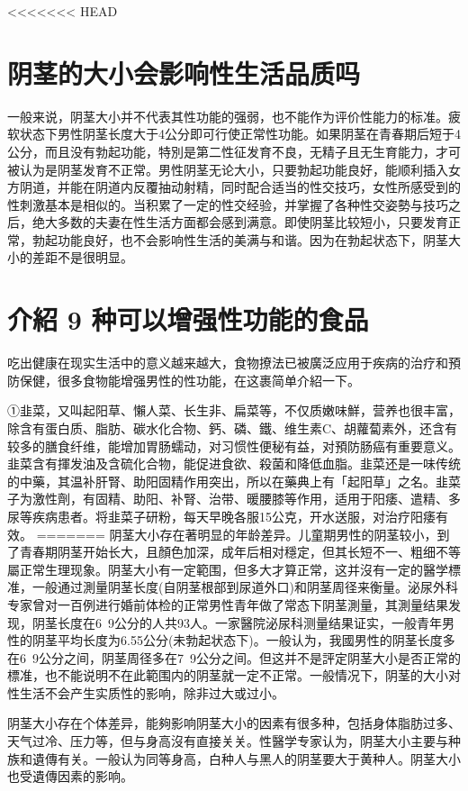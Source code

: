 \documentclass[12pt,UTF8]{ctexbook}
\begin{document}
<<<<<<< HEAD

\section{阴茎的大小会影响性生活品质吗}

一般来说，阴茎大小并不代表其性功能的强弱，也不能作为评价性能力的标准。疲软状态下男性阴茎长度大于4公分即可行使正常性功能。如果阴茎在青春期后短于4公分，而且没有勃起功能，特別是第二性征发育不良，无精子且无生育能力，才可被认为是阴茎发育不正常。男性阴茎无论大小，只要勃起功能良好，能顺利插入女方阴道，并能在阴道内反覆抽动射精，同时配合适当的性交技巧，女性所感受到的性刺激基本是相似的。当积累了一定的性交经验，并掌握了各种性交姿勢与技巧之后，绝大多数的夫妻在性生活方面都会感到满意。即使阴茎比较短小，只要发育正常，勃起功能良好，也不会影响性生活的美满与和谐。因为在勃起状态下，阴茎大小的差距不是很明显。

\section{介紹 9 种可以增强性功能的食品}

吃出健康在现实生活中的意义越来越大，食物撩法已被廣泛应用于疾病的治疗和預防保健，很多食物能增强男性的性功能，在这裹简单介紹一下。

①韭菜，又叫起阳草、懶人菜、长生非、扁菜等，不仅质嫩味鮮，营养也很丰富，除含有蛋白质、脂肪、碳水化合物、鈣、磷、鐵、维生素C、胡蘿蔔素外，还含有较多的膳食纤维，能增加胃肠蠕动，对习惯性便秘有益，对預防肠癌有重要意义。韭菜含有揮发油及含硫化合物，能促进食欲、殺菌和降低血脂。韭菜还是一味传统的中藥，其温补肝腎、助阳固精作用突出，所以在藥典上有「起阳草」之名。韭菜子为激性劑，有固精、助阳、补腎、治带、暖腰膝等作用，适用于阳痿、遣精、多尿等疾病患者。将韭菜子研粉，每天早晚各服15公克，开水送服，对治疗阳痿有效。
=======
阴茎大小存在著明显的年龄差异。儿童期男性的阴茎较小，到了青春期阴茎开始长大，且顏色加深，成年后相对穩定，但其长短不一、粗细不等屬正常生理现象。阴茎大小有一定範围，但多大才算正常，这并沒有一定的醫学標准，一般通过測量阴茎长度(自阴茎根部到尿道外口)和阴茎周径来衡量。泌尿外科专家曾对一百例进行婚前体检的正常男性青年做了常态下阴茎測量，其測量结果发现，阴茎长度在6~9公分的人共93人。一家醫院泌尿科测量结果证实，一般青年男性的阴茎平均长度为6.55公分(未勃起状态下)。一般认为，我國男性的阴茎长度多在6~9公分之间，阴茎周径多在7~9公分之间。但这并不是評定阴茎大小是否正常的標准，也不能说明不在此範围内的阴茎就一定不正常。一般情况下，阴茎的大小对性生活不会产生实质性的影响，除非过大或过小。

阴茎大小存在个体差异，能夠影响阴茎大小的因素有很多种，包括身体脂肪过多、天气过冷、压力等，但与身高沒有直接关关。性醫学专家认为，阴茎大小主要与种族和遺傳有关。一般认为同等身高，白种人与黑人的阴茎要大于黄种人。阴茎大小也受遺傳因素的影响。
\end{document}
